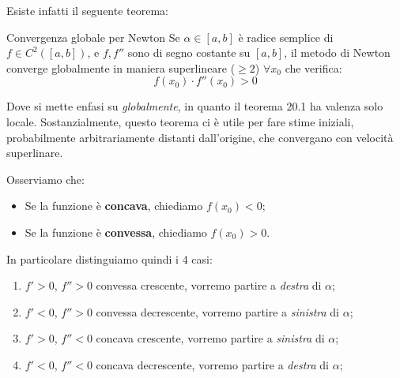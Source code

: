 \documentclass[a4paper,11pt]{article}
\begin{document}
Esiste infatti il seguente teorema:
\begin{theorem}{Convergenza globale per Newton}
	Se $\alpha \in [a, b]$ è radice semplice di $f \in C^2([a, b])$, e $f, f''$ sono di segno costante su $[a, b]$, il metodo di Newton converge globalmente in maniera superlineare ($\geq 2$) $\forall x_0$ che verifica:
	$$
	f(x_0) \cdot f''(x_0) > 0
	$$
\end{theorem}
Dove si mette enfasi su \textit{globalmente}, in quanto il teorema 20.1 ha valenza solo locale.
Sostanzialmente, questo teorema ci è utile per fare stime iniziali, probabilmente arbitrariamente distanti dall'origine, che convergano con velocità superlinare.

Osserviamo che:
\begin{itemize}
	\item Se la funzione è \textbf{concava}, chiediamo $f(x_0) < 0$;
	\item Se la funzione è \textbf{convessa}, chiediamo $f(x_0) > 0$.
\end{itemize}

In particolare distinguiamo quindi i 4 casi:
\begin{enumerate}
	\item $f' > 0$, $f'' > 0$ convessa crescente, vorremo partire a \textit{destra} di $\alpha$;
	\item $f' < 0$, $f'' > 0$ convessa decrescente, vorremo partire a \textit{sinistra} di $\alpha$;
	\item $f' > 0$, $f'' < 0$ concava crescente, vorremo partire a \textit{sinistra} di $\alpha$;
	\item $f' < 0$, $f'' < 0$ concava decrescente, vorremo partire a \textit{destra} di $\alpha$;
\end{enumerate}

\newpage
\end{document}
